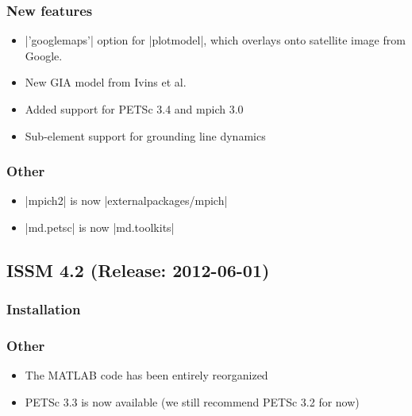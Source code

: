 \subsubsection{New features}
\begin{itemize}
\item \lstinlinebg|'googlemaps'| option for \lstinlinebg|plotmodel|, which overlays onto satellite image from Google.
\item New GIA model from Ivins et al.
\item Added support for PETSc 3.4 and mpich 3.0
\item Sub-element support for grounding line dynamics
\end{itemize}
\subsubsection{Other}
\begin{itemize}
\item \lstinlinebg|mpich2| is now \lstinlinebg|externalpackages/mpich|
\item \lstinlinebg|md.petsc| is now \lstinlinebg|md.toolkits|
\end{itemize}

\subsection*{ISSM 4.2 (Release: 2012-06-01)}
\subsubsection{Installation}
\subsubsection{Other}
\begin{itemize}
\item The MATLAB code has been entirely reorganized
\item PETSc 3.3 is now available (we still recommend PETSc 3.2 for now)
\end{itemize}

